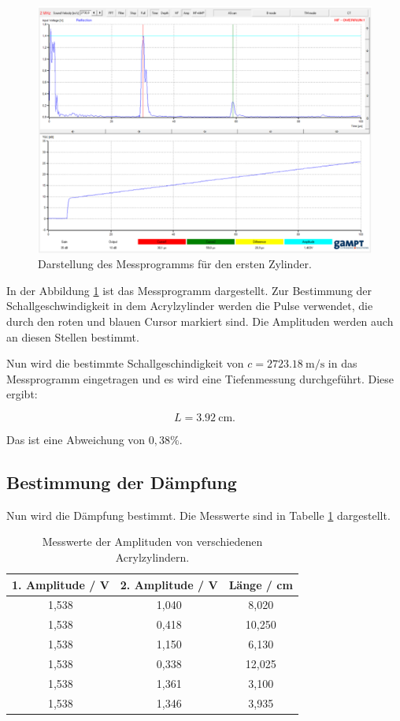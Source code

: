 \begin{figure}[H]
  \centering
  \includegraphics[width=\textwidth]{content/Programm.png}
  \caption{Darstellung des Messprogramms für den ersten Zylinder.}
  \label{abb:1}
\end{figure}

In der Abbildung \ref{abb:1} ist das Messprogramm dargestellt. Zur Bestimmung der
Schallgeschwindigkeit in dem Acrylzylinder werden die Pulse verwendet, die durch
den roten und blauen Cursor markiert sind. Die Amplituden werden auch an diesen Stellen
bestimmt.

Nun wird die bestimmte Schallgeschindigkeit von $c = \SI{2723.18}{\meter\per\second}$
in das Messprogramm eingetragen und es wird eine Tiefenmessung durchgeführt.
Diese ergibt:

\begin{equation*}
  L = \SI{3.92}{\centi\meter}.
\end{equation*}

Das ist eine Abweichung von $0,38 \%$.

\subsection{Bestimmung der Dämpfung}

Nun wird die Dämpfung bestimmt. Die Messwerte sind in Tabelle \ref{tab:3} dargestellt.

\begin{table}[H]
  \centering
  \caption{Messwerte der Amplituden von verschiedenen Acrylzylindern.}
  \label{tab:3}
  \begin{tabular}{c c c}
    \toprule
    1. Amplitude / V & 2. Amplitude / V & Länge / cm \\
    \midrule
    1,538 & 1,040 &  8,020 \\
    1,538 & 0,418 & 10,250 \\
    1,538 & 1,150 &  6,130 \\
    1,538 & 0,338 & 12,025 \\
    1,538 & 1,361 &  3,100 \\
    1,538 & 1,346 &  3,935 \\
    \bottomrule
  \end{tabular}
\end{table}

